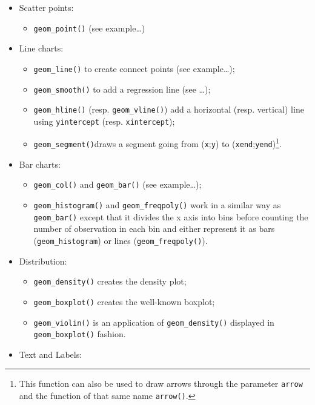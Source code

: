 \documentclass[
]{book}
\providecommand{\tightlist}{%
  \setlength{\itemsep}{0pt}\setlength{\parskip}{0pt}}
\begin{document}
\begin{itemize}
\tightlist
\item
  Scatter points:

  \begin{itemize}
  \tightlist
  \item
    \texttt{geom\_point()} (see example\ldots)
  \end{itemize}
\item
  Line charts:

  \begin{itemize}
  \tightlist
  \item
    \texttt{geom\_line()} to create connect points (see example\ldots);
  \item
    \texttt{geom\_smooth()} to add a regression line (see \ldots);
  \item
    \texttt{geom\_hline()} (resp. \texttt{geom\_vline()}) add a horizontal (resp. vertical) line using \texttt{yintercept} (resp. \texttt{xintercept});
  \item
    \texttt{geom\_segment()}draws a segment going from (\texttt{x};\texttt{y}) to (\texttt{xend};\texttt{yend})\footnote{This function can also be used to draw arrows through the parameter \texttt{arrow} and the function of that same name \texttt{arrow()}.}.
  \end{itemize}
\item
  Bar charts:

  \begin{itemize}
  \tightlist
  \item
    \texttt{geom\_col()} and \texttt{geom\_bar()} (see example\ldots);
  \item
    \texttt{geom\_histogram()} and \texttt{geom\_freqpoly()} work in a similar way as \texttt{geom\_bar()} except that it divides the x axis into bins before counting the number of observation in each bin and either represent it as bars (\texttt{geom\_histogram}) or lines (\texttt{geom\_freqpoly()}).
  \end{itemize}
\item
  Distribution:

  \begin{itemize}
  \tightlist
  \item
    \texttt{geom\_density()} creates the density plot;
  \item
    \texttt{geom\_boxplot()} creates the well-known boxplot;
  \item
    \texttt{geom\_violin()} is an application of \texttt{geom\_density()} displayed in \texttt{geom\_boxplot()} fashion.
  \end{itemize}
\item
  Text and Labels:


\end{itemize}
\end{document}
